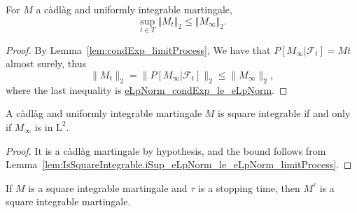 \begin{lemma}\label{lem:iSup_eLpNorm_le_eLpNorm_limitProcess}
  \leanok
For $M$ a càdlàg and uniformly integrable martingale,
$$\sup_{t \in T} \Vert M_t \Vert_2 \le \Vert M_\infty \Vert_2.$$
\end{lemma}

\begin{proof}
  \leanok
By Lemma~\ref{lem:condExp_limitProcess}, We have that $P[M_\infty | \mathcal{F}_t] = M t$ almost surely, thus
$$\|M_t\|_2 = \|P[M_\infty | \mathcal{F}_t]\|_2 \le \|M_\infty\|_2,$$
where the last inequality is \href{https://leanprover-community.github.io/mathlib4_docs/Mathlib/MeasureTheory/Function/ConditionalExpectation/Real.html#MeasureTheory.eLpNorm_condExp_le_eLpNorm}{eLpNorm\_condExp\_le\_eLpNorm}.
\end{proof}


\begin{lemma}\label{lem:isSquareIntegrable_of_limitProcess}
  \leanok
A càdlàg and uniformly integrable martingale $M$ is square integrable if and only if $M_\infty$ is in $\mathrm L^2$.
\end{lemma}

\begin{proof}
  \leanok
It is a càdlàg martingale by hypothesis, and the bound follows from Lemma~\ref{lem:IsSquareIntegrable.iSup_eLpNorm_le_eLpNorm_limitProcess}.
\end{proof}


\begin{lemma}\label{lem:IsSquareIntegrable.stoppedProcess}
  \leanok
If $M$ is a square integrable martingale and $\tau$ is a stopping time, then $M^\tau$ is a square integrable martingale.
\end{lemma}

